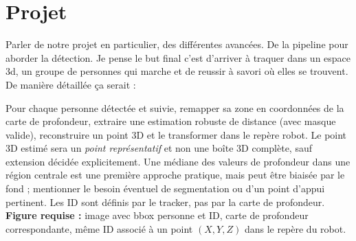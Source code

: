 \documentclass[11pt,a4paper]{article}
\begin{document}
\section{Projet}

Parler de notre projet en particulier, des différentes avancées. De la pipeline pour aborder la détection. Je pense le but final c'est d'arriver à traquer dans un espace 3d, un groupe de personnes qui marche et de reussir à savori où elles se trouvent. De manière détaillée ça serait : 

Pour chaque personne détectée et suivie, remapper sa zone en coordonnées de la carte de profondeur, extraire une estimation robuste de distance (avec masque valide), reconstruire un point 3D et le transformer dans le repère robot. Le point 3D estimé sera un \emph{point représentatif} et non une boîte 3D complète, sauf extension décidée explicitement. Une médiane des valeurs de profondeur dans une région centrale est une première approche pratique, mais peut être biaisée par le fond ; mentionner le besoin éventuel de segmentation ou d'un point d'appui pertinent. Les ID sont définis par le tracker, pas par la carte de profondeur.
\noindent \textbf{Figure requise :} image avec bbox personne et ID, carte de profondeur correspondante, même ID associé à un point $(X,Y,Z)$ dans le repère du robot.

\begingroup
\small
\printbibliography[title={Bibliographie citée dans ce plan}]
\endgroup
\end{document}
